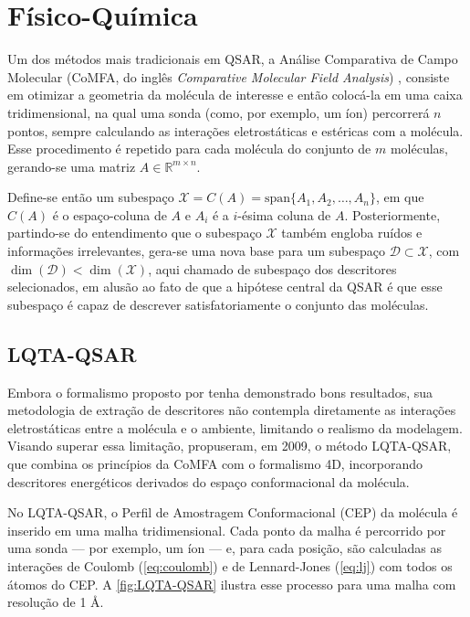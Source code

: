 \section{Físico-Química} \label{sec:fisquim}

Um dos métodos mais tradicionais em QSAR, a Análise Comparativa de Campo Molecular (CoMFA, do inglês \textit{Comparative Molecular Field Analysis}) \cite{Cramer1988}, consiste em otimizar a geometria da molécula de interesse e então colocá-la em uma caixa tridimensional, na qual uma sonda (como, por exemplo, um íon) percorrerá \( n \) pontos, sempre calculando as interações eletrostáticas e estéricas com a molécula. Esse procedimento é repetido para cada molécula do conjunto de \( m \) moléculas, gerando-se uma matriz \( A \in \mathbb{R}^{m \times n} \).

Define-se então um subespaço \( \mathcal{X} = C(A) = \text{span}\{A_1, A_2, \ldots, A_n\} \), em que \( C(A) \) é o espaço-coluna de \( A \) e \( A_i \) é a \( i \)-ésima coluna de \( A \). Posteriormente, partindo-se do entendimento que o subespaço \( \mathcal{X} \) também engloba ruídos e informações irrelevantes, gera-se uma nova base para um subespaço \( \mathcal{D} \subset \mathcal{X} \), com \( \dim(\mathcal{D}) < \dim(\mathcal{X}) \), aqui chamado de subespaço dos descritores selecionados, em alusão ao fato de que a hipótese central da QSAR é que esse subespaço é capaz de descrever satisfatoriamente o conjunto das moléculas.

\subsection{LQTA-QSAR}

Embora o formalismo proposto por \textcite{Hopfinger1997} tenha demonstrado bons resultados, sua metodologia de extração de descritores não contempla diretamente as interações eletrostáticas entre a molécula e o ambiente, limitando o realismo da modelagem. Visando superar essa limitação, \textcite{LQTAQSAR2009} propuseram, em 2009, o método LQTA-QSAR, que combina os princípios da CoMFA \cite{Cramer1988} com o formalismo 4D, incorporando descritores energéticos derivados do espaço conformacional da molécula.

No LQTA-QSAR, o Perfil de Amostragem Conformacional (CEP) da molécula é inserido em uma malha tridimensional. Cada ponto da malha é percorrido por uma sonda --- por exemplo, um íon  --- e, para cada posição, são calculadas as interações de Coulomb (\autoref{eq:coulomb}) e de Lennard-Jones (\autoref{eq:lj}) com todos os átomos do CEP. A \autoref{fig:LQTA-QSAR} ilustra esse processo para uma malha com resolução de 1 \AA.


